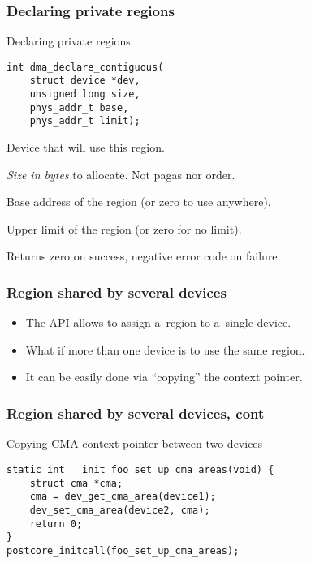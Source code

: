\begin{frame}[fragile]
  \frametitle{Declaring private regions}

  \begin{block}{Declaring private regions}
\begin{lstlisting}
int dma_declare_contiguous(
    struct device *dev,
    unsigned long size,
    phys_addr_t base,
    phys_addr_t limit);
\end{lstlisting}
  \end{block}

  \begin{description}[countAA]
  \item[{\ttfamily dev}] Device that will use this region.
  \item[{\ttfamily size}] \emph{Size in bytes} to
    allocate. {\footnotesize Not pagas nor order.}
  \item[{\ttfamily base}] Base address of the region (or zero to use
    anywhere).
  \item[{\ttfamily limit}] Upper limit of the region (or zero for no
    limit).
  \item Returns zero on success, negative error code on failure.
  \end{description}
\end{frame}

\begin{frame}[fragile]
  \frametitle{Region shared by several devices}

  \begin{itemize}
  \item The API allows to assign a~region to a~single device.
  \item What if more than one device is to use the same region.
  \item It can be easily done via “copying” the context pointer.
  \end{itemize}
\end{frame}

\begin{frame}[fragile]
  \frametitle{Region shared by several devices, cont}

  \begin{block}{Copying CMA context pointer between two devices}
\begin{lstlisting}
static int __init foo_set_up_cma_areas(void) {
    struct cma *cma;
    cma = dev_get_cma_area(device1);
    dev_set_cma_area(device2, cma);
    return 0;
}
postcore_initcall(foo_set_up_cma_areas);
\end{lstlisting}
  \end{block}
\end{frame}

